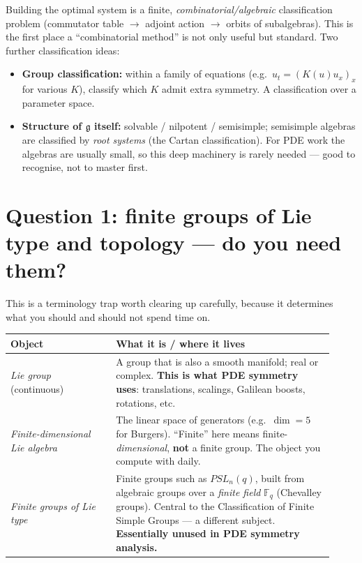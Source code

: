 \documentclass[11pt]{article}
\theoremstyle{definition}
\theoremstyle{remark}
\newcommand{\g}{\mathfrak{g}}
\begin{document}
Building the optimal system is a finite, \emph{combinatorial/algebraic} classification problem (commutator
table $\to$ adjoint action $\to$ orbits of subalgebras). This is the first place a ``combinatorial method''
is not only useful but standard. Two further classification ideas:
\begin{itemize}[nosep]
  \item \textbf{Group classification:} within a family of equations (e.g.\ $u_t=(K(u)u_x)_x$ for various
        $K$), classify which $K$ admit extra symmetry. A classification over a parameter space.
  \item \textbf{Structure of $\g$ itself:} solvable / nilpotent / semisimple; semisimple algebras are
        classified by \emph{root systems} (the Cartan classification). For PDE work the algebras are
        usually small, so this deep machinery is rarely needed --- good to recognise, not to master first.
\end{itemize}

\section{Question 1: finite groups of Lie type and topology --- do you need them?}
\label{sec:finite}

This is a terminology trap worth clearing up carefully, because it determines what you should and should
not spend time on.

\begin{center}
\begin{tabular}{p{0.30\linewidth} p{0.62\linewidth}}
\hline
\textbf{Object} & \textbf{What it is / where it lives} \\ \hline
\emph{Lie group} (continuous) & A group that is also a smooth manifold; real or complex. \textbf{This is
what PDE symmetry uses}: translations, scalings, Galilean boosts, rotations, etc. \\[2pt]
\emph{Finite-dimensional Lie algebra} & The linear space of generators (e.g.\ $\dim=5$ for Burgers).
``Finite'' here means finite-\emph{dimensional}, \textbf{not} a finite group. The object you compute
with daily. \\[2pt]
\emph{Finite groups of Lie type} & Finite groups such as $PSL_n(q)$, built from algebraic groups over a
\emph{finite field} $\mathbb{F}_q$ (Chevalley groups). Central to the Classification of Finite Simple
Groups --- a different subject. \textbf{Essentially unused in PDE symmetry analysis.} \\ \hline
\end{tabular}
\end{center}
\end{document}
